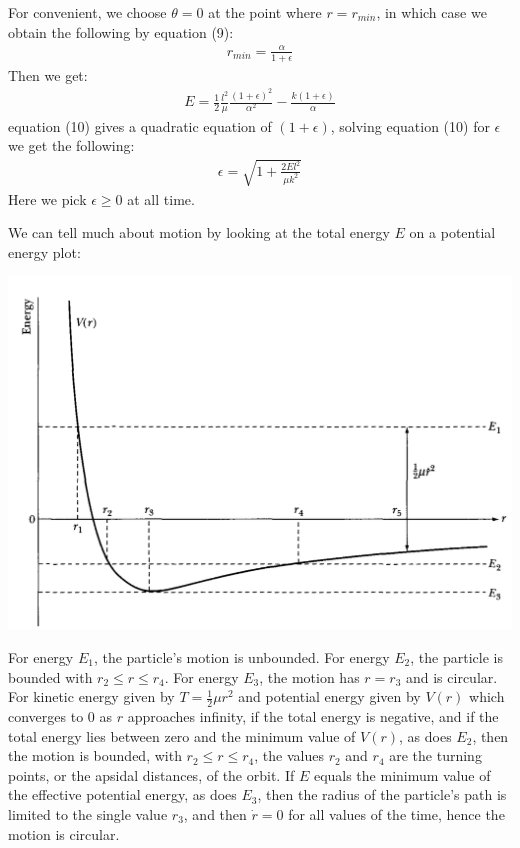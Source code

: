 \documentclass[11pt,oneside]{book}
\theoremstyle{break}
\theoremstyle{break}
\begin{document}
For convenient, we choose $\theta = 0 $ at the point where $r = r_{min}$, in which case we obtain the following by equation (9):
\begin{align*}
r_{min} = \frac{\alpha}{1+\epsilon}
\end{align*}
Then we get:
\begin{align*}
E = \frac{1}{2}\frac{l^2}{\mu}\frac{(1+\epsilon)^2}{\alpha^2} - \frac{k(1+\epsilon)}{\alpha} \tag{10}
\end{align*}
equation (10) gives a quadratic equation of $(1+\epsilon)$, solving equation (10) for $\epsilon$ we get the following:
\begin{align*}
\epsilon = \sqrt{1+ \frac{2E l^2}{\mu k^2}} 
\end{align*}
Here we pick $\epsilon \geq 0$ at all time.\\
\newpage

We can tell much about motion by looking at the total energy $E$ on a potential energy plot:
\begin{center}
\includegraphics[scale=0.39]{PE.png}
\end{center}
For energy $E_1$, the particle's motion is unbounded. For energy $E_2$, the particle is bounded with $r_2 \leq r \leq r_4$. For energy $E_3$, the motion has $r= r_3$ and is circular. For kinetic energy given by $T= \frac{1}{2}\mu r^2$ and potential energy given by $V(r)$ which converges to $0$ as $r$ approaches infinity, if the total energy is negative, and if the total energy lies between zero and the minimum value of $V(r)$, as does $E_2$, then the motion is bounded, with $r_2 \leq r\leq r_4$, the values $r_2$ and $r_4$ are the turning points, or the apsidal distances, of the orbit. If $E$ equals the minimum value of the effective potential energy, as does $E_3$, then the radius of the particle's path is limited to the single value $r_3$, and then $\dot{r} = 0$ for all values of the time, hence the motion is circular. \\
\end{document}
